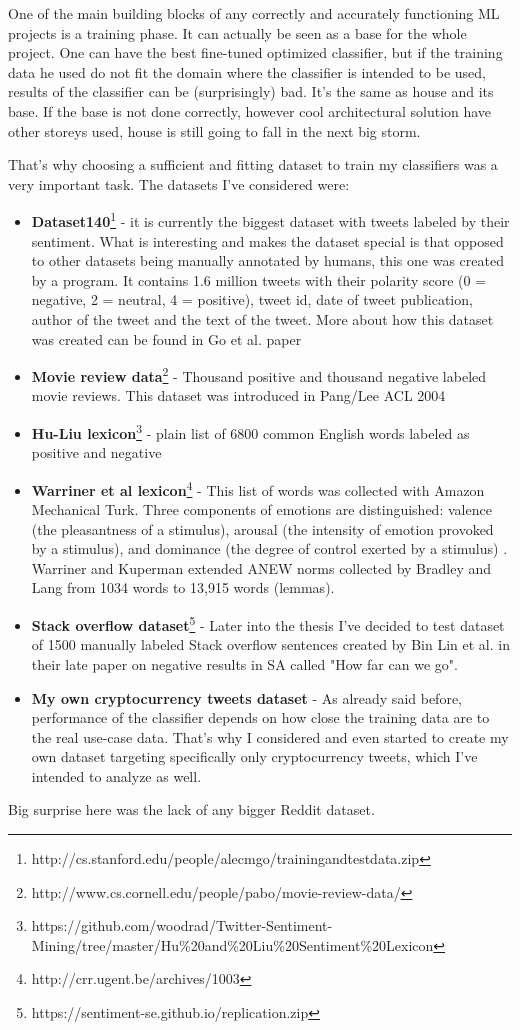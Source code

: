 One of the main building blocks of any correctly and accurately functioning ML projects is a training phase. It can actually be seen as a base for the whole project. One can have the best fine-tuned optimized classifier, but if the training data he used do not fit the domain where the classifier is intended to be used, results of the classifier can be (surprisingly) bad. It's the same as house and its base. If the base is not done correctly, however cool architectural solution have other storeys used, house is still going to fall in the next big storm.

That's why choosing a sufficient and fitting dataset to train my classifiers was a very important task. The datasets I've considered were:
\begin{itemize}
  \item \textbf{Dataset140}\footnote{http://cs.stanford.edu/people/alecmgo/trainingandtestdata.zip} - it is currently the biggest dataset with tweets labeled by their sentiment. What is interesting and makes the dataset special is that opposed to other datasets being manually annotated by humans, this one was created by a program. It contains 1.6 million tweets with their polarity score (0 = negative, 2 = neutral, 4 = positive), tweet id, date of tweet publication, author of the tweet and the text of the tweet. More about how this dataset was created can be found in Go et al. paper \cite{go2009twitter}
  \item \textbf{Movie review data}\footnote{http://www.cs.cornell.edu/people/pabo/movie-review-data/} - Thousand positive and thousand negative labeled movie reviews. This dataset was introduced in Pang/Lee ACL 2004 \cite{pang2004sentimental}
  \item \textbf{Hu-Liu lexicon}\footnote{https://github.com/woodrad/Twitter-Sentiment-Mining/tree/master/Hu\%20and\%20Liu\%20Sentiment\%20Lexicon} - plain list of 6800 common English words labeled as positive and negative
  \item \textbf{Warriner et al lexicon}\footnote{http://crr.ugent.be/archives/1003} - This list of words was collected with Amazon Mechanical Turk. Three components of emotions are distinguished: valence (the pleasantness of a stimulus), arousal (the intensity of emotion provoked by a stimulus), and dominance (the degree of control exerted by a stimulus) \cite{warriner2013norms}. Warriner and Kuperman extended ANEW norms collected by Bradley and Lang from 1034 words to 13,915 words (lemmas).
  \item \textbf{Stack overflow dataset}\footnote{https://sentiment-se.github.io/replication.zip} - Later into the thesis I've decided to test dataset of 1500 manually labeled Stack overflow sentences created by Bin Lin et al. in their late paper on negative results in SA called "How far can we go".
    \item \textbf{My own cryptocurrency tweets dataset} - As already said before, performance of the classifier depends on how close the training data are to the real use-case data. That's why I considered and even started to create my own dataset targeting specifically only cryptocurrency tweets, which I've intended to analyze as well.
\end{itemize}

Big surprise here was the lack of any bigger Reddit dataset.